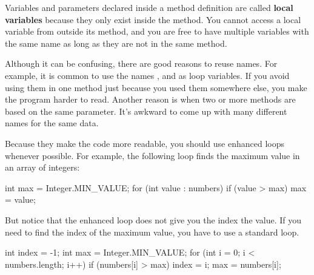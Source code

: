 

Variables and parameters declared inside a method definition are called {\bf local variables} because they only exist inside the method.
You cannot access a local variable from outside its method, and you are free to have multiple variables with the same name as long as they are not in the same method.


Although it can be confusing, there are good reasons to reuse names.
For example, it is common to use the names ,  and  as loop variables.
If you avoid using them in one method just because you used them somewhere else, you make the program harder to read.
Another reason is when two or more methods are based on the same parameter.
It's awkward to come up with many different names for the same data.



Because they make the code more readable, you should use enhanced  loops whenever possible.
For example, the following loop finds the maximum value in an array of integers:

\begin{code}
    int max = Integer.MIN_VALUE;
    for (int value : numbers) {
        if (value > max) {
            max = value;
        }
    }
\end{code}

But notice that the enhanced  loop does not give you the index the value.
If you need to find the index of the maximum value, you have to use a standard  loop.

\begin{code}
    int index = -1;
    int max = Integer.MIN_VALUE;
    for (int i = 0; i < numbers.length; i++) {
        if (numbers[i] > max) {
            index = i;
            max = numbers[i];
        }
    }
\end{code}


